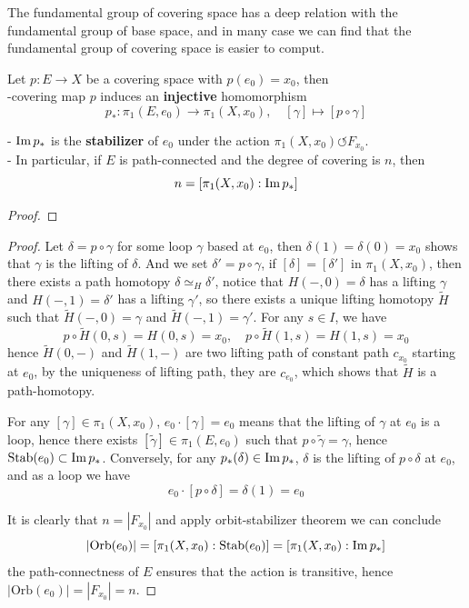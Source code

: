 \documentclass[12pt,a4paper]{article}
\begin{document}
The fundamental group of covering space has a deep relation with the fundamental group of base space, and in many case we can find that the fundamental group of covering space is easier to comput.
\begin{proposition} \label{injectivemorphism}
    Let \(p:E \to X\) be a covering space with \(p(e_0) = x_0\), then\\
    
    -covering map \(p\) induces an \textbf{injective} homomorphism
    \[p_*: \pi_1(E,e_0) \to \pi_1(X,x_0), \quad [\gamma] \mapsto [p \circ \gamma]\]

    - \(\operatorname{Im} p_*\) is the \textbf{stabilizer} of \(e_0\) under the action \(\pi_1(X,x_0) \circlearrowleft F_{x_0}\).\\

    - In particular, if \(E\) is path-connected and the degree of covering is \(n\), then
    \[n = [\pi_1(X,x_0): \operatorname{Im} p_*]\]
\end{proposition}
\begin{proof}
    
\end{proof}
\begin{proof}
    Let \(\delta = p \circ \gamma\) for some loop \(\gamma \) based at \(e_0\), then \(\delta(1) = \delta(0) = x_0\) shows that \(\gamma\) is the lifting of \(\delta\). And we set \(\delta'  = p \circ \gamma\), if \([\delta] = [\delta']\) in \(\pi_1(X,x_0)\), then there exists a path homotopy \(\delta \simeq_H \delta'\), notice that \(H(-,0) = \delta\) has a lifting \(\gamma\) and \(H(-,1) = \delta'\) has a lifting \(\gamma'\), so there exists a unique lifting homotopy \(\tilde{H}\) such that \(\tilde{H}(-,0) = \gamma\) and \(\tilde{H}(-,1) = \gamma'\). For any \(s \in I\), we have
    \[p\circ \tilde{H}(0,s) = H(0,s) = x_0, \quad p\circ \tilde{H}(1,s) = H(1,s) = x_0\]
    hence \(\tilde{H}(0,-)\) and \(\tilde{H}(1,-)\) are two lifting path of constant path \(c_{x_0}\) starting at \(e_0\), by the uniqueness of lifting path, they are \(c_{e_0}\), which shows that \(\tilde{H}\) is a path-homotopy.
    
    For any \([\gamma] \in \pi_1(X,x_0)\), \(e_0 \cdot [\gamma] = e_0\) means that the lifting of \(\gamma\) at \(e_0\) is a loop, hence there exists \([\tilde{\gamma}] \in \pi_1(E,e_0)\) such that \(p \circ \tilde{\gamma} = \gamma\), hence \(\mathrm{Stab}(e_0) \subset \operatorname{Im} p_*\). Conversely, for any \(p_*(\delta) \in \operatorname{Im} p_*\), \(\delta\) is the lifting of \(p \circ \delta\) at \(e_0\), and as a loop we have
    \[e_0 \cdot [p\circ \delta] = \delta(1) = e_0\]

    It is clearly that \(n = |F_{x_0}|\) and apply orbit-stabilizer theorem we can conclude
    \[|\mathrm{Orb}(e_0)| = [\pi_1(X,x_0): \mathrm{Stab}(e_0)] = [\pi_1(X,x_0): \operatorname{Im} p_*]\]
    the path-connectness of \(E\) ensures that the action is transitive, hence \(|\mathrm{Orb}(e_0)| = |F_{x_0}| = n\).
\end{proof}
\end{document}
